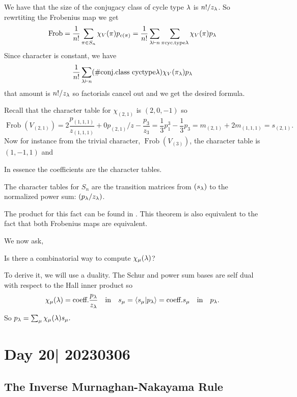 \documentclass[12pt]{memoir}
\DeclareMathOperator{\Frob}{Frob}
\begin{document}
\begin{ptcbp}
    We have that the size of the conjugacy class of cycle type $\lambda$ is $n!/z_\lambda$. So rewrtiting the Frobenius map we get 
    $$\Frob=\frac{1}{n!}\sum_{\pi\in S_n}\chi_V(\pi)p_{c(\pi)}=\frac{1}{n!}\sum_{\la\vdash n}\sum_{\pi\text{cyc.type}\la}\chi_V(\pi)p_{\la}$$
    Since character is constant, we have 
    $$\frac{1}{n!}\sum_{\lambda\vdash n}(\#\text{conj.class cyctype}\lambda)\chi_V(\pi_\lambda)p_\lambda$$
    that amount is $n!/z_\lambda$ so factorials cancel out and we get the desired formula.
\end{ptcbp}

\begin{Ex}
    Recall that the character table for $\chi_{(2,1)}$ is $(2,0,-1)$ so
    $$\Frob(V_{(2,1)})=2\frac{p_{(1,1,1)}}{z_{(1,1,1)}}+0p_{(2,1)}/z-\frac{p_3}{z_3}=\frac{1}{3}p_1^3-\frac{1}{3}p_3=m_{(2,1)}+2m_{(1,1,1)}=s_{(2,1)}.$$
    Now for instance from the trivial character, $\Frob(V_{(3)})$, the character table is $(1,-1,1)$ and 
\end{Ex}

In essence the coefficients are the character tables.

\begin{Th}
    The character tables for $S_n$ are the transition matrices from $(s_\lambda)$ to the normalized power sum: $(p_\lambda/z_\lambda)$. 
\end{Th}

The product for this fact can be found in \cite{StanleyEnum2}. This theorem is also equivalent to the fact that both Frobenius maps are equivalent.\par 
We now ask, 
\begin{significant}
    Is there a combinatorial way to compute $\chi_\mu(\lambda)$?
\end{significant}

To derive it, we will use a duality. The Schur and power sum bases are self dual with respect to the Hall inner product so 
$$\chi_\mu(\lambda)=\text{coeff.}\frac{p_\lambda}{z_\lambda}\quad\text{in}\quad s_\mu=\braket{s_\mu}{p_\lambda}=\text{coeff.}s_\mu\quad\text{in}\quad p_\lambda.$$
So $p_\lambda=\sum_\mu\chi_{\mu}(\lambda)s_{\mu}.$

\section{Day 20| 20230306}

\subsection*{The Inverse Murnaghan-Nakayama Rule}
\end{document}
